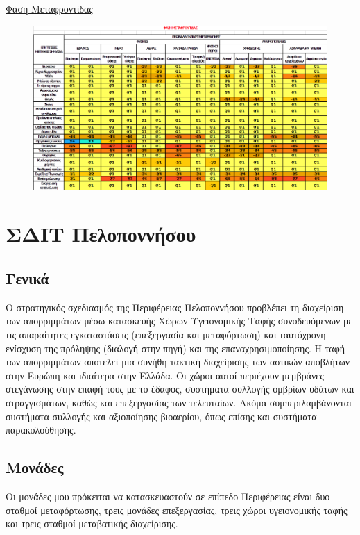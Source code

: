 \documentclass[12pt]{article}
\begin{document}
	\underline{Φάση Μεταφροντίδας}
	
	\begin{figure} [H]
		\begin{center}
			\includegraphics [scale = 0.65] {table27.png}
		\end{center}
	\end{figure}
	
	\section{ΣΔΙΤ Πελοποννήσου}
	
	\subsection{Γενικά}
	
	Ο στρατηγικός σχεδιασμός της Περιφέρειας Πελοποννήσου προβλέπει τη διαχείριση των απορριμμάτων μέσω κατασκευής Χώρων Υγειονομικής Ταφής συνοδευόμενων με τις απαραίτητες εγκαταστάσεις (επεξεργασία και μεταφόρτωση) και ταυτόχρονη ενίσχυση της πρόληψης (διαλογή στην πηγή) και της επαναχρησιμοποίησης. Η ταφή των απορριμμάτων αποτελεί μια συνήθη τακτική διαχείρισης των αστικών αποβλήτων στην Ευρώπη και ιδιαίτερα στην Ελλάδα. Οι χώροι αυτοί περιέχουν μεμβράνες στεγάνωσης στην επαφή τους με το έδαφος, συστήματα συλλογής ομβρίων υδάτων και στραγγισμάτων, καθώς και επεξεργασίας των τελευταίων. Ακόμα συμπεριλαμβάνονται συστήματα συλλογής και αξιοποίησης βιοαερίου, όπως επίσης και συστήματα παρακολούθησης. 
	
	\subsection{Μονάδες}
	
	Οι μονάδες μου πρόκειται να κατασκευαστούν σε επίπεδο Περιφέρειας είναι δυο σταθμοί μεταφόρτωσης, τρεις μονάδες επεξεργασίας, τρεις χώροι υγειονομικής ταφής και τρεις σταθμοί μεταβατικής διαχείρισης. 
	
\end{document}
